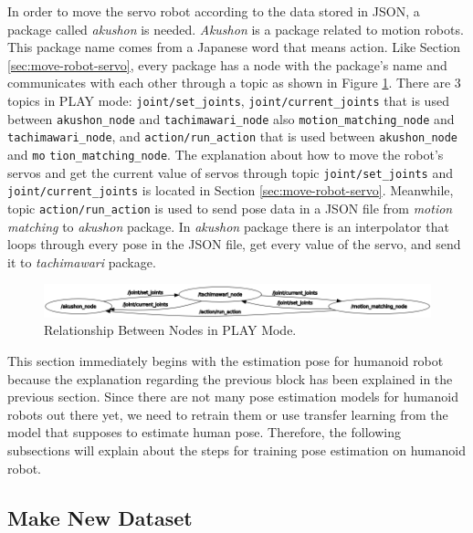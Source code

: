 In order to move the servo robot according to the data stored in JSON, a package called \emph{akushon} is needed. \emph{Akushon} is a package related to motion robots. This package name comes from a Japanese word that means action.
Like Section \ref{sec:move-robot-servo}, every package has a node with the package's name and communicates with each other through a topic as shown in Figure \ref{fig:relation-node-play-mode}. There are 3 topics in PLAY mode: \verb|joint/set_joints|, \verb|joint/current_joints| that is used between \verb|akushon_node| and \verb|tachimawari_node| also \verb|motion_matching_node| and \verb|tachimawari_node|,
and \verb|action/run_action| that is used between \verb|akushon_node| and \verb|mo| \verb|tion_matching_node|.
The explanation about how to move the robot's servos and get the current value of servos through topic \verb|joint/set_joints| and \verb|joint/current_joints| is located in Section \ref{sec:move-robot-servo}.
Meanwhile, topic \verb|action/run_action| is used to send pose data in a JSON file from \emph{motion matching} to \emph{akushon} package. In \emph{akushon} package there is an interpolator that loops through every pose in the JSON file, get every value of the servo, and send it to \emph{tachimawari} package.
\begin{figure}[ht]
  \centering
  \includegraphics[scale=0.64]{gambar/rqt_akushon.png}
  \caption{Relationship Between Nodes in PLAY Mode.}
  \label{fig:relation-node-play-mode}
\end{figure}

This section immediately begins with the estimation pose for humanoid robot because the explanation regarding the previous block has been explained in the previous section.
Since there are not many pose estimation models for humanoid robots out there yet, we need to retrain them or use transfer learning from the model that supposes to estimate human pose.
Therefore, the following subsections will explain about the steps for training pose estimation on humanoid robot.

\subsection{Make New Dataset}
\label{subsec:make-new-dataset}


